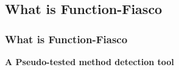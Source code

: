 \subsection{What is Function-Fiasco}
\begin{frame}
  \frametitle{What is Function-Fiasco}
    \begin{center}
      \huge{\textbf{A Pseudo-tested method detection tool}}
    \end{center}
\end{frame}
